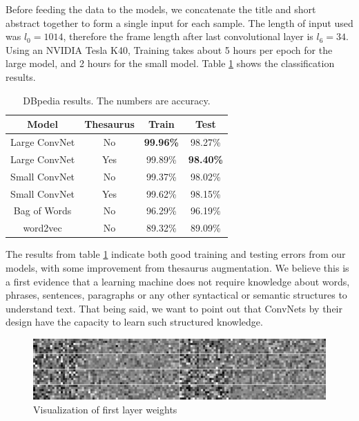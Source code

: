 \documentclass{article}
\begin{document}
\begin{CJK}{UTF8}{gbsn}
Before feeding the data to the models, we concatenate the title and short abstract together to form a single input for each sample. The length of input used was \(l_0 = 1014\), therefore the frame length after last convolutional layer is \(l_6 = 34\). Using an NVIDIA Tesla K40, Training takes about 5 hours per epoch for the large model, and 2 hours for the small model. Table \ref{tab:dbpr} shows the classification results.

\begin{table}[ht]
  \caption{DBpedia results. The numbers are accuracy.}
  \label{tab:dbpr}
  \begin{center}
    \begin{tabular}{cccc}
      \hline
      \abovespace\belowspace
      Model & Thesaurus & Train & Test  \\
      \hline
      \abovespace
      Large ConvNet & No & \textbf{99.96\%} & 98.27\% \\
      Large ConvNet & Yes & 99.89\% & \textbf{98.40\%} \\
      Small ConvNet & No & 99.37\% & 98.02\% \\
      Small ConvNet & Yes & 99.62\% & 98.15\% \\
      Bag of Words & No & 96.29\% & 96.19\% \\
      \belowspace
      word2vec & No & 89.32\% & 89.09\% \\
      \hline
    \end{tabular}
  \end{center}
\end{table}

The results from table \ref{tab:dbpr} indicate both good training and testing errors from our models, with some improvement from thesaurus augmentation. We believe this is a first evidence that a learning machine does not require knowledge about words, phrases, sentences, paragraphs or any other syntactical or semantic structures to understand text. That being said, we want to point out that ConvNets by their design have the capacity to learn such structured knowledge.

\begin{figure}[ht]
  \centering
  \includegraphics[width=\columnwidth]{dbpd_1layer}
  \caption{Visualization of first layer weights}
  \label{fig:1lay}
\end{figure}


\end{CJK}
\end{document}
